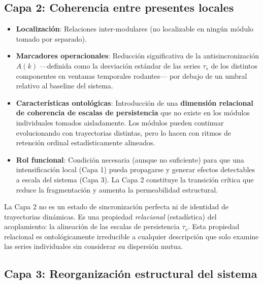\subsection{Capa 2: Coherencia entre presentes locales}

\begin{itemize}
    \item \textbf{Localización}: Relaciones inter-modulares (no localizable en ningún módulo tomado por separado).
    \item \textbf{Marcadores operacionales}: Reducción significativa de la antisincronización $A(k)$ —definida como la desviación estándar de las series $\tau_s$ de los distintos componentes en ventanas temporales rodantes— por debajo de un umbral relativo al baseline del sistema.
    \item \textbf{Características ontológicas}: Introducción de una \textbf{dimensión relacional de coherencia de escalas de persistencia} que no existe en los módulos individuales tomados aisladamente. Los módulos pueden continuar evolucionando con trayectorias distintas, pero lo hacen con ritmos de retención ordinal estadísticamente alineados.
    \item \textbf{Rol funcional}: Condición necesaria (aunque no suficiente) para que una intensificación local (Capa 1) pueda propagarse y generar efectos detectables a escala del sistema (Capa 3). La Capa 2 constituye la transición crítica que reduce la fragmentación y aumenta la permeabilidad estructural.
\end{itemize}

La Capa 2 no es un estado de sincronización perfecta ni de identidad de trayectorias dinámicas. Es una propiedad \textit{relacional} (estadística) del acoplamiento: la alineación de las escalas de persistencia $\tau_s$. Esta propiedad relacional es ontológicamente irreducible a cualquier descripción que solo examine las series individuales sin considerar su dispersión mutua.

\subsection{Capa 3: Reorganización estructural del sistema}

